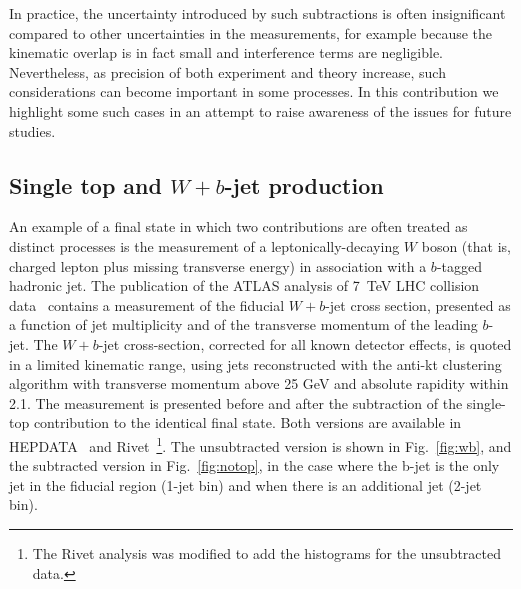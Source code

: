 \documentclass[11pt]{cernrep}
\begin{document}
In practice, the uncertainty introduced by such subtractions is often insignificant compared to other uncertainties in the measurements, 
for example because the kinematic overlap
is in fact small and interference terms are negligible. 
Nevertheless, as precision of both experiment and theory increase, such considerations can become important in some processes.
In this contribution we highlight some such cases in an attempt 
to raise awareness of the issues for future studies. 

\subsection{Single top and $W+b$-jet production}

An example of a final state in which two contributions are often treated as distinct processes is the measurement of a 
leptonically-decaying $W$ boson (that is, charged lepton plus missing transverse energy) in association with a $b$-tagged hadronic jet. 
The publication of the ATLAS analysis of 7~TeV LHC collision data~\cite{Aad:2013vka} contains a measurement of the fiducial $W+b$-jet
cross section, 
presented as a function of jet multiplicity and of the transverse momentum of the leading $b$-jet. 
The $W+b$-jet cross-section, corrected for all known detector effects, 
is quoted in a limited kinematic range, using jets reconstructed with the anti-kt
clustering algorithm with transverse momentum above 25 GeV and absolute rapidity within 2.1.
The measurement is presented before and after the subtraction of the single-top contribution to the identical final state. Both
versions are available in HEPDATA~\cite{hepdata} and Rivet~\cite{Buckley:2010ar}\footnote{The Rivet analysis was modified to add the histograms 
for the unsubtracted data.}. 
The unsubtracted version is shown in Fig.~\ref{fig:wb}, and the subtracted version in Fig.~\ref{fig:notop},
in the case where the b-jet is the only jet in the ﬁducial region (1-jet bin) and when there is an additional jet (2-jet bin).
 
\end{document}
